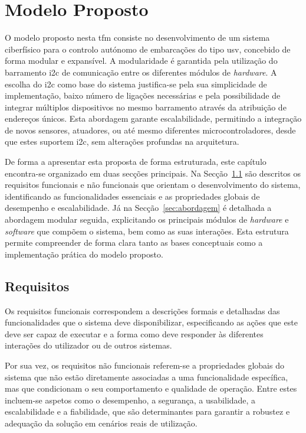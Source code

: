 \chapter{Modelo Proposto}
\label{ch:modeloProposto}

O modelo proposto nesta \gls{tfm} consiste no desenvolvimento de um sistema ciberfísico para o controlo autónomo de embarcações do tipo \gls{usv}, concebido de forma modular e expansível. A modularidade é garantida pela utilização do barramento \gls{i2c} de comunicação entre os diferentes módulos de \emph{hardware}. A escolha do \gls{i2c} como base do sistema justifica-se pela sua simplicidade de implementação, baixo número de ligações necessárias e pela possibilidade de integrar múltiplos dispositivos no mesmo barramento através da atribuição de endereços únicos. Esta abordagem garante escalabilidade, permitindo a integração de novos sensores, atuadores, ou até mesmo diferentes microcontroladores, desde que estes suportem \gls{i2c}, sem alterações profundas na arquitetura.

De forma a apresentar esta proposta de forma estruturada, este capítulo encontra-se organizado em duas secções principais. Na Secção~\ref{sec:requisitos} são descritos os requisitos funcionais e não funcionais que orientam o desenvolvimento do sistema, identificando as funcionalidades essenciais e as propriedades globais de desempenho e escalabilidade. Já na Secção~\ref{sec:abordagem} é detalhada a abordagem modular seguida, explicitando os principais módulos de \emph{hardware} e \emph{software} que compõem o sistema, bem como as suas interações. Esta estrutura permite compreender de forma clara tanto as bases conceptuais como a implementação prática do modelo proposto.

\section{Requisitos}
\label{sec:requisitos}

Os requisitos funcionais correspondem a descrições formais e detalhadas das funcionalidades que o sistema deve disponibilizar, especificando as ações que este deve ser capaz de executar e a forma como deve responder às diferentes interações do utilizador ou de outros sistemas.  

Por sua vez, os requisitos não funcionais referem-se a propriedades globais do sistema que não estão diretamente associadas a uma funcionalidade específica, mas que condicionam o seu comportamento e qualidade de operação. Entre estes incluem-se aspetos como o desempenho, a segurança, a usabilidade, a escalabilidade e a fiabilidade, que são determinantes para garantir a robustez e adequação da solução em cenários reais de utilização.

